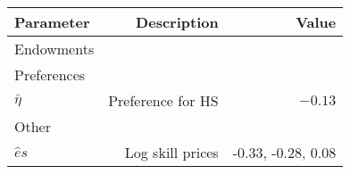 \begin{tabular}{lrr}
\hline
Parameter & Description  & Value  \\
\hline
Endowments &   &   \\
Preferences &   &   \\
$\bar{\eta}$ & Preference for HS  & $-0.13$  \\
Other &   &   \\
$\hat{e}{s}$ & Log skill prices  & -0.33, -0.28, 0.08  \\
\hline
\end{tabular}%
